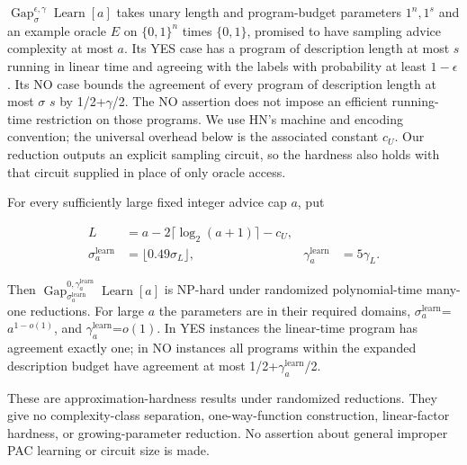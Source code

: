 \(\operatorname{Gap}^{\epsilon,\gamma}_\sigma\operatorname{Learn}[a]\) takes unary length and program-budget parameters \(1^n,1^s\) and an example oracle \(E\) on \(\{0,1\}^n\) times \(\{0,1\}\), promised to have sampling advice complexity at most \(a\). Its YES case has a program of description length at most \(s\) running in linear time and agreeing with the labels with probability at least \(1-\epsilon\). Its NO case bounds the agreement of every program of description length at most \(\sigma\) \(s\) by 1/2+\(\gamma\)/2. The NO assertion does not impose an efficient running-time restriction on those programs. We use HN's machine and encoding convention; the universal overhead below is the associated constant \(c_U\). Our reduction outputs an explicit sampling circuit, so the hardness also holds with that circuit supplied in place of only oracle access.

\begin{corollary}\label{cor:learn}For every sufficiently large fixed integer advice cap \(a\), put

\begin{equation}\label{eq:2}
\begin{aligned} L&=a-2\lceil\log_2(a+1)\rceil-c_U,\\ \sigma_a^{\mathrm{learn}}&=\lfloor0.49\sigma_L\rfloor, &\gamma_a^{\mathrm{learn}}&=5\gamma_L.\end{aligned}
\end{equation}

Then \(\operatorname{Gap}^{0,\gamma_a^{\mathrm{learn}}}_{\sigma_a^{\mathrm{learn}}}\operatorname{Learn}[a]\) is NP-hard under randomized polynomial-time many-one reductions. For large \(a\) the parameters are in their required domains, \(\sigma^{\mathrm{\mathrm{learn}}}_a\)=\(a^{1-o(1)}\), and \(\gamma^{\mathrm{\mathrm{learn}}}_a\)=\(o(1)\). In YES instances the linear-time program has agreement exactly one; in NO instances all programs within the expanded description budget have agreement at most 1/2+\(\gamma^{\mathrm{\mathrm{learn}}}_a\)/2.
\end{corollary}

These are approximation-hardness results under randomized reductions. They give no complexity-class separation, one-way-function construction, linear-factor hardness, or growing-parameter reduction. No assertion about general improper PAC learning or circuit size is made.

